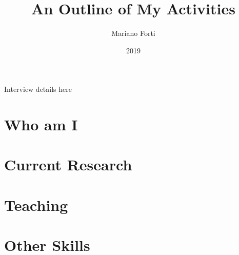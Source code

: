 \documentclass{beamer}
\title{An Outline of My Activities}
\author{Mariano Forti}
\date{2019}
\begin{document}
\begin{frame}
\titlepage
\begin{center}
  Interview details here
\end{center}

\end{frame}


\section{Who am I}


\section{Current Research}





\section{Teaching}


\section{Other Skills}

\end{document}
